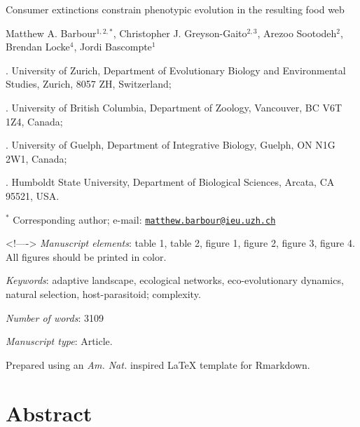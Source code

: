 \documentclass[11pt,]{article}
\title{}
\author{}
\date{}
\begin{document}
\vspace*{0.1cm}

\begin{center} \LARGE Consumer extinctions constrain phenotypic evolution in the resulting food web \end{center}

\bigskip

\begin{center} \large Matthew A. Barbour$^{1,2,\ast}$, Christopher J. Greyson-Gaito$^{2,3}$, Arezoo Sootodeh$^{2}$, Brendan Locke$^{4}$, Jordi Bascompte$^{1}$ \normalsize \end{center}

\bigskip

. University of Zurich, Department of Evolutionary Biology
and Environmental Studies, Zurich, 8057 ZH, Switzerland;

. University of British Columbia, Department of Zoology,
Vancouver, BC V6T 1Z4, Canada;

. University of Guelph, Department of Integrative Biology,
Guelph, ON N1G 2W1, Canada;

. Humboldt State University, Department of Biological
Sciences, Arcata, CA 95521, USA.

\(^\ast\) Corresponding author; e-mail:
\href{mailto:matthew.barbour@ieu.uzh.ch}{\nolinkurl{matthew.barbour@ieu.uzh.ch}}

\bigskip
<!----> \emph{Manuscript elements}: table 1, table 2, figure 1, figure
2, figure 3, figure 4. All figures should be printed in color.

\bigskip

\emph{Keywords}: adaptive landscape, ecological networks,
eco-evolutionary dynamics, natural selection, host-parasitoid;
complexity.

\bigskip

\emph{Number of words}: 3109

\bigskip

\emph{Manuscript type}: Article.

\bigskip

\footnotesize Prepared using an \emph{Am. Nat.} inspired \LaTeX{}
template for Rmarkdown. \normalsize

\linenumbers{} \modulolinenumbers[3]

\newpage

\section{Abstract}\label{abstract}
\end{document}
